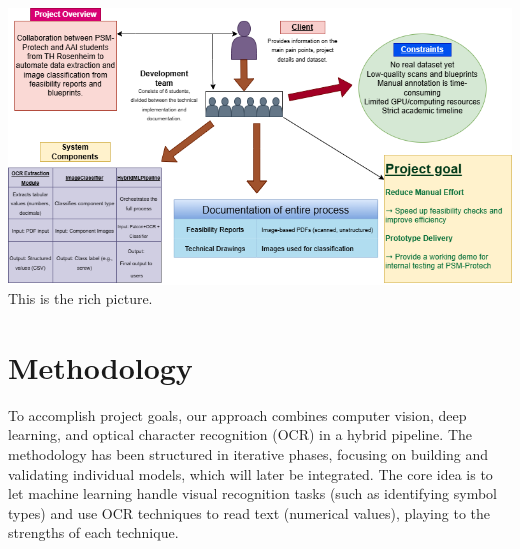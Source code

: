 \documentclass[11pt,a4paper]{article}
\begin{document}
\begin{center}
  \includegraphics[width=\textwidth]{Rich-Picure.drawio.png}\\[5mm]
  This is the rich picture.
\end{center}

\section{Methodology}
To accomplish project goals, our approach combines computer vision, deep learning, and optical character recognition (OCR) in a hybrid pipeline. The methodology has been structured in iterative phases, focusing on building and validating individual models, which will later be integrated. The core idea is to let machine learning handle visual recognition tasks (such as identifying symbol types) and use OCR techniques to read text (numerical values), playing to the strengths of each technique. 
\end{document}
